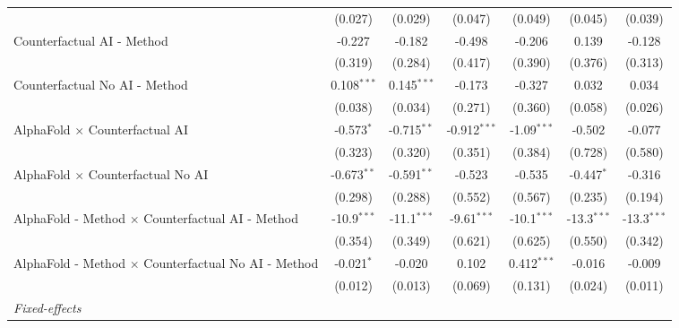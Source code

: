 \begin{tabular}{lcccccc}
                                                              & (0.027)       & (0.029)       & (0.047)        & (0.049)       & (0.045)        & (0.039)\\   
   Counterfactual AI - Method                                 & -0.227        & -0.182        & -0.498         & -0.206        & 0.139          & -0.128\\   
                                                              & (0.319)       & (0.284)       & (0.417)        & (0.390)       & (0.376)        & (0.313)\\   
   Counterfactual No AI - Method                              & 0.108$^{***}$ & 0.145$^{***}$ & -0.173         & -0.327        & 0.032          & 0.034\\   
                                                              & (0.038)       & (0.034)       & (0.271)        & (0.360)       & (0.058)        & (0.026)\\   
   AlphaFold $\times$ Counterfactual AI                       & -0.573$^{*}$  & -0.715$^{**}$ & -0.912$^{***}$ & -1.09$^{***}$ & -0.502         & -0.077\\   
                                                              & (0.323)       & (0.320)       & (0.351)        & (0.384)       & (0.728)        & (0.580)\\   
   AlphaFold $\times$ Counterfactual No AI                    & -0.673$^{**}$ & -0.591$^{**}$ & -0.523         & -0.535        & -0.447$^{*}$   & -0.316\\   
                                                              & (0.298)       & (0.288)       & (0.552)        & (0.567)       & (0.235)        & (0.194)\\   
   AlphaFold - Method $\times$ Counterfactual AI - Method     & -10.9$^{***}$ & -11.1$^{***}$ & -9.61$^{***}$  & -10.1$^{***}$ & -13.3$^{***}$  & -13.3$^{***}$\\   
                                                              & (0.354)       & (0.349)       & (0.621)        & (0.625)       & (0.550)        & (0.342)\\   
   AlphaFold - Method $\times$ Counterfactual No AI - Method  & -0.021$^{*}$  & -0.020        & 0.102          & 0.412$^{***}$ & -0.016         & -0.009\\   
                                                              & (0.012)       & (0.013)       & (0.069)        & (0.131)       & (0.024)        & (0.011)\\   
   \midrule
   \emph{Fixed-effects}\\

\end{tabular}
